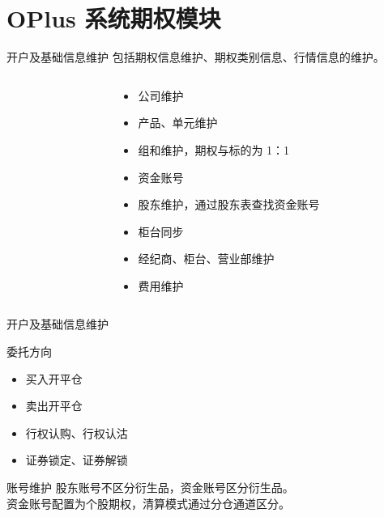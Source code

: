\documentclass[12pt]{ctexbeamer}	%
\begin{document}

\section{OPlus 系统期权模块}

\begin{frame}{开户及基础信息维护}
  包括期权信息维护、期权类别信息、行情信息的维护。
  \begin{columns}
    \begin{column}{0.60\textwidth}
    \end{column}
    \begin{column}{0.40\textwidth}
      \begin{itemize}
        \item 公司维护
        \item 产品、单元维护
        \item 组和维护，期权与标的为 1：1
        \item 资金账号
        \item 股东维护，通过股东表查找资金账号
        \item 柜台同步
        \item 经纪商、柜台、营业部维护
        \item 费用维护
      \end{itemize}
    \end{column}
  \end{columns}
\end{frame}

\begin{frame}{开户及基础信息维护}
  \begin{block}{委托方向}
    \begin{itemize}
      \item 买入开平仓
      \item 卖出开平仓
      \item 行权认购、行权认沽
      \item 证券锁定、证券解锁
    \end{itemize}
  \end{block}
  \begin{block}{账号维护}
    股东账号不区分衍生品，资金账号区分衍生品。\\
    资金账号配置为个股期权，清算模式通过分仓通道区分。
  \end{block}
\end{frame}
\end{document}
